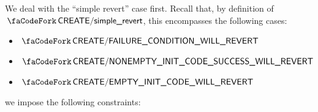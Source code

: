\begin{center}
\end{center}
We deal with the ``simple revert'' case first. Recall that, by definition of $\scenCreateSimpleRevert$, this encompasses the following cases:
\begin{itemize}
	\item $\scenCreateFCondWillRevert$
	\item $\scenCreateNonEmptyInitCodeSuccessWillRevert$
	\item $\scenCreateEmptyInitCodeWillRevert$
\end{itemize}
we impose the following constraints:

